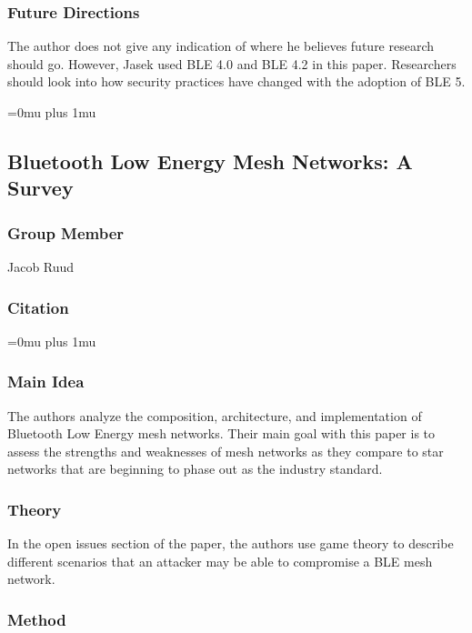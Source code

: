 \subsubsection{Future Directions}
The author does not give any indication of where he believes future research should go. However, Jasek used BLE 4.0 and BLE 4.2 in this paper. Researchers should look into how security practices have changed with the adoption of BLE 5. 
\noindent


\Urlmuskip=0mu plus 1mu\relax

\subsection{Bluetooth Low Energy Mesh Networks: A Survey}

\subsubsection{Group Member}

\noindent
Jacob Ruud

\noindent
\subsubsection{Citation}

\Urlmuskip=0mu plus 1mu\relax
{}

\subsubsection{Main Idea}

\noindent
The authors analyze the composition, architecture, and implementation of Bluetooth Low Energy mesh networks. Their main goal with this paper is to assess the strengths and weaknesses of mesh networks as they compare to star networks that are beginning to phase out as the industry standard.

\subsubsection{Theory}

\noindent
In the open issues section of the paper, the authors use game theory to describe different scenarios that an attacker may be able to compromise a BLE mesh network.

\subsubsection{Method}

